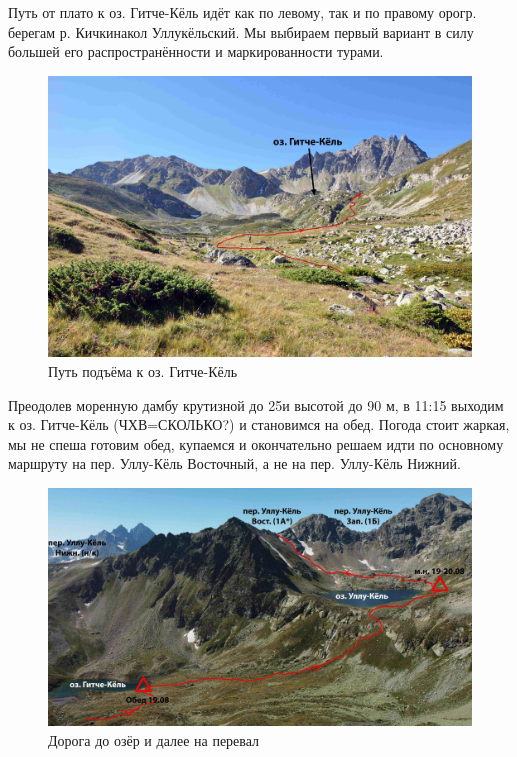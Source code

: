 Путь от плато к оз. Гитче-Кёль идёт как по левому, так и по правому орогр. берегам р. Кичкинакол Уллукёльский. Мы выбираем первый вариант в силу большей его распространённости и маркированности турами. 

\begin{figure}[h!]
	\centering
	\includegraphics[width=0.7\linewidth]{../pics/DSC_0718}
	\caption{Путь подъёма к оз. Гитче-Кёль}
	\label{fig:DSC_0718}
\end{figure}

Преодолев моренную дамбу крутизной до 25\degree и высотой до 90 м, в 11:15 выходим к оз. Гитче-Кёль (ЧХВ=\alert{СКОЛЬКО?}) и становимся на обед. 
Погода стоит жаркая, мы не спеша готовим обед, купаемся и окончательно решаем идти по основному маршруту на пер. Уллу-Кёль Восточный, а не на пер. Уллу-Кёль Нижний.



\begin{figure}[h!]
	\centering
	\includegraphics[width=0.7\linewidth]{../pics/ullu_kuel_route}
	\caption{Дорога до озёр и далее на перевал}
	\label{fig:ullu_kuel_route}
\end{figure}

